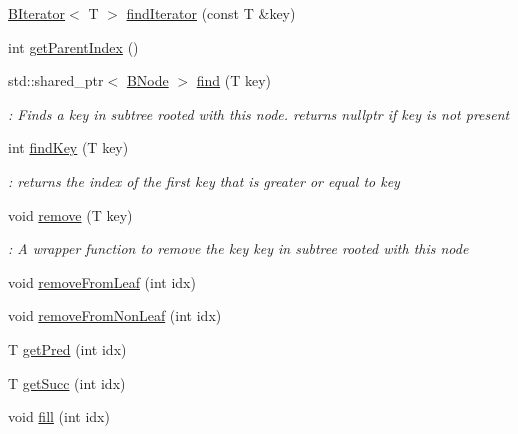 \begin{DoxyCompactItemize}
\hyperlink{classBIterator}{B\+Iterator}$<$ T $>$ \hyperlink{classBTree_1_1BNode_a0a8c168d152ef320e62c0283c4db3f26}{find\+Iterator} (const T \&key)
\item 
int \hyperlink{classBTree_1_1BNode_a559e979d22e13c7b455fef771af47049}{get\+Parent\+Index} ()
\item 
\mbox{\label{classBTree_1_1BNode_a646808ce526bbf4b5e5df0348fcca8db}} 
std\+::shared\+\_\+ptr$<$ \hyperlink{classBTree_1_1BNode}{B\+Node} $>$ \hyperlink{classBTree_1_1BNode_a646808ce526bbf4b5e5df0348fcca8db}{find} (T key)
\begin{DoxyCompactList}\small\item\em \+: Finds a key in subtree rooted with this node.  returns nullptr if key is not present \end{DoxyCompactList}\item 
\mbox{\label{classBTree_1_1BNode_a53972c6065afd789a1fdb79fe96d25e9}} 
int \hyperlink{classBTree_1_1BNode_a53972c6065afd789a1fdb79fe96d25e9}{find\+Key} (T key)
\begin{DoxyCompactList}\small\item\em \+: returns the index of the first key that is greater or equal to key \end{DoxyCompactList}\item 
\mbox{\label{classBTree_1_1BNode_a2e926c4518aecdbb1dcf853431edfb0c}} 
void \hyperlink{classBTree_1_1BNode_a2e926c4518aecdbb1dcf853431edfb0c}{remove} (T key)
\begin{DoxyCompactList}\small\item\em \+: A wrapper function to remove the key key in subtree rooted with this node \end{DoxyCompactList}\item 
void \hyperlink{classBTree_1_1BNode_a1153066a0735afbd355c762795b68222}{remove\+From\+Leaf} (int idx)
\item 
void \hyperlink{classBTree_1_1BNode_acea1502de0852161a72a4c11e122e58e}{remove\+From\+Non\+Leaf} (int idx)
\item 
T \hyperlink{classBTree_1_1BNode_afacc18e039955c714241d33341649656}{get\+Pred} (int idx)
\item 
T \hyperlink{classBTree_1_1BNode_af5d36fa614e035a65758f716f5902d82}{get\+Succ} (int idx)
\item 
void \hyperlink{classBTree_1_1BNode_a20d3152742afa0fbb11e413a0c73ceb9}{fill} (int idx)

\end{DoxyCompactItemize}
